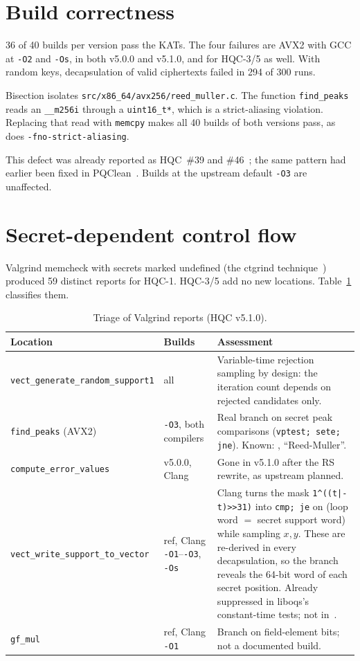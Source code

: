 \documentclass[11pt,a4paper]{article}
\begin{document}
\section{Build correctness}\label{sec:kat}
36 of 40 builds per version pass the KATs. The four failures are AVX2 with GCC at \texttt{-O2} and \texttt{-Os}, in both v5.0.0 and v5.1.0, and for HQC-3/5 as well. With random keys, decapsulation of valid ciphertexts failed in 294 of 300 runs.

Bisection isolates \texttt{src/x86\_64/avx256/reed\_muller.c}. The function \texttt{find\_peaks} reads an \texttt{\_\_m256i} through a \texttt{uint16\_t*}, which is a strict-aliasing violation. Replacing that read with \texttt{memcpy} makes all 40 builds of both versions pass, as does \texttt{-fno-strict-aliasing}.

This defect was already reported as HQC~\#39 and \#46~\cite{HQC39,HQC46}; the same pattern had earlier been fixed in PQClean~\cite{PQClean453}. Builds at the upstream default \texttt{-O3} are unaffected.

\section{Secret-dependent control flow}\label{sec:ct}
Valgrind memcheck with secrets marked undefined (the ctgrind technique~\cite{ctgrind}) produced 59 distinct reports for HQC-1. HQC-3/5 add no new locations. Table~\ref{tab:ct} classifies them.

\begin{table}[h]\centering\small
\begin{tabular}{p{5.1cm}p{2.9cm}p{6.6cm}}\hline
Location & Builds & Assessment\\\hline
\texttt{vect\_generate\_random\_support1} & all & Variable-time rejection sampling by design: the iteration count depends on rejected candidates only.\\
\texttt{find\_peaks} (AVX2) & \texttt{-O3}, both compilers & Real branch on secret peak comparisons (\texttt{vptest; sete; jne}). Known: \cite{HQC11}, ``Reed-Muller''.\\
\texttt{compute\_error\_values} & v5.0.0, Clang & Gone in v5.1.0 after the RS rewrite, as upstream planned.\\
\texttt{vect\_write\_support\_to\_vector} & ref, Clang \texttt{-O1}--\texttt{-O3}, \texttt{-Os} & Clang turns the mask \texttt{1\^{}((t|-t)>>31)} into \texttt{cmp; je} on (loop word $=$ secret support word) while sampling $x,y$. These are re-derived in every decapsulation, so the branch reveals the 64-bit word of each secret position. Already suppressed in liboqs's constant-time tests; not in~\cite{HQC11}.\\
\texttt{gf\_mul} & ref, Clang \texttt{-O1} & Branch on field-element bits; not a documented build.\\\hline
\end{tabular}
\caption{Triage of Valgrind reports (HQC v5.1.0).}\label{tab:ct}
\end{table}
\end{document}
